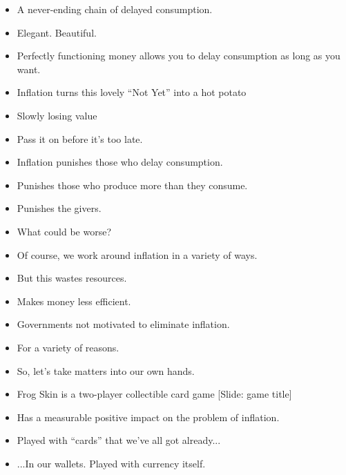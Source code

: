 \documentclass[12pt]{article}
\begin{document}
{\begin{itemize}
\item A never-ending chain of delayed consumption.

\item Elegant.  Beautiful.



\item Perfectly functioning money allows you to delay consumption as long as you want.

\item Inflation turns this lovely ``Not Yet'' into a hot potato

\item Slowly losing value

\item Pass it on before it's too late.

\item Inflation punishes those who delay consumption.

\item Punishes those who produce more than they consume.

\item Punishes the givers.  

\item What could be worse?

\item Of course, we work around inflation in a variety of ways.

\item But this wastes resources.

\item Makes money less efficient.

\item Governments not motivated to eliminate inflation.

\item For a variety of reasons.

\item So, let's take matters into our own hands.

\item Frog Skin is a two-player collectible card game [Slide:  game title] 

\item Has a measurable positive impact on the problem of inflation.

\item Played with ``cards'' that we've all got already...

\item ...In our wallets.  Played with currency itself.



\end{itemize}}
\end{document}
